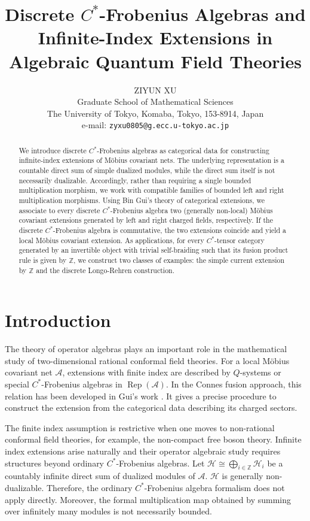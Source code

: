 \documentclass{article}
\title{\huge{Discrete $C^*$-Frobenius Algebras and Infinite-Index Extensions in Algebraic Quantum Field Theories}}
\author{{\sc ZIYUN XU}\\{\small Graduate School of Mathematical Sciences}\\{\small The University of Tokyo, Komaba, Tokyo, 153-8914, Japan}\\{\small e-mail: {\tt zyxu0805@g.ecc.u-tokyo.ac.jp}}}
\newcommand{\hilb}{\mathcal{H}}
\newcommand{\A}{\mathcal{A}}
\newcommand{\Z}{\mathbb{Z}}
\begin{document}
\maketitle
\begin{abstract}

We introduce discrete $C^*$-Frobenius algebras as categorical data for constructing infinite-index extensions of M\"{o}bius covariant nets. The underlying representation is a countable direct sum of simple dualized modules, while the direct sum itself is not necessarily dualizable. Accordingly, rather than requiring a single bounded multiplication morphism, we work with compatible families of bounded left and right multiplication morphisms.
Using Bin Gui's theory of categorical extensions, we associate to every discrete
$C^*$-Frobenius algebra two (generally non-local) M\"{o}bius covariant extensions generated by left and right charged fields, respectively. If the discrete $C^*$-Frobenius algebra is commutative, the two extensions coincide and yield a local M\"{o}bius covariant extension. 
As applications,  for every $C^*$-tensor category generated by an invertible object with trivial self-braiding such that its fusion product rule is given by  $\Z$, 
we construct two classes of examples: the simple current extension by $\Z$ and the discrete Longo-Rehren construction.


\end{abstract}





\section{Introduction}

The theory of operator algebras plays an important role in the mathematical study of two-dimensional rational
conformal field theories. For a local M\"{o}bius covariant net $\A$, extensions with finite index are described by 
$Q$-systems \cite{longo1994duality} or special $C^*$-Frobenius algebras \cite{fuchs2003category} in $\operatorname{Rep}(\A)$. In the Connes fusion approach, 
this relation has been developed in Gui's work \cite{gui2021bisognano,gui2025connes}. It gives a precise procedure to construct the extension 
from the categorical data describing its charged sectors. 

The finite index assumption is restrictive when one moves to non-rational conformal field theories, for example, the non-compact free boson theory. Infinite
index extensions arise naturally and their operator algebraic study requires structures beyond 
ordinary $C^*$-Frobenius algebras.
Let $\hilb \cong \bigoplus_{i\in\Z}\hilb_i$ 
be a countably infinite direct sum of dualized modules of $\A$. $\hilb$ is generally non-dualizable. Therefore,
the ordinary $C^*$-Frobenius algebra formalism does not apply directly. Moreover, 
the formal multiplication map obtained by summing over infinitely many modules is not necessarily bounded.  
\end{document}

